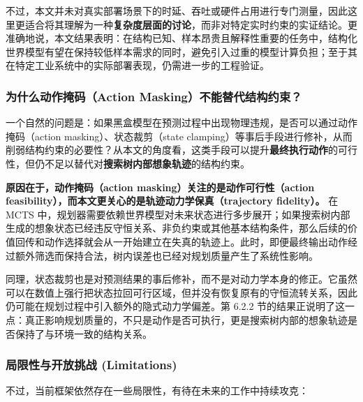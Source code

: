 \documentclass[UTF8]{ctexart}
\begin{document}
不过，本文并未对真实部署场景下的时延、吞吐或硬件占用进行专门测量，因此这里更适合将其理解为一种\textbf{复杂度层面的讨论}，而非对特定实时约束的实证结论。更准确地说，本文结果表明：在结构已知、样本昂贵且解释性重要的任务中，结构化世界模型有望在保持较低样本需求的同时，避免引入过重的模型计算负担；至于其在特定工业系统中的实际部署表现，仍需进一步的工程验证。

\hypertarget{ux9884ux5148ux5e94ux5bf9ux53efux80fdux8d28ux7591ux4e3aux4ec0ux4e48-action-masking-ux4e0dux591fux7528}{%
\subsubsection{为什么动作掩码（Action Masking）不能替代结构约束？}\label{ux9884ux5148ux5e94ux5bf9ux53efux80fdux8d28ux7591ux4e3aux4ec0ux4e48-action-masking-ux4e0dux591fux7528}}

一个自然的问题是：如果黑盒模型在预测过程中出现物理违规，是否可以通过动作掩码（action masking）、状态裁剪（state clamping）等事后手段进行修补，从而削弱结构约束的必要性？从本文的角度看，这类手段可以提升\textbf{最终执行动作}的可行性，但仍不足以替代对\textbf{搜索树内部想象轨迹}的结构约束。

\textbf{原因在于，动作掩码（action masking）关注的是动作可行性（action feasibility），而本文更关心的是轨迹动力学保真（trajectory fidelity）。} 在 MCTS 中，规划器需要依赖世界模型对未来状态进行多步展开；如果搜索树内部生成的想象状态已经违反守恒关系、非负约束或其他基本结构条件，那么后续的价值回传和动作选择就会从一开始建立在失真的轨迹上。此时，即便最终输出动作经过额外筛选而保持合法，树内误差也已经对规划质量产生了系统性影响。

同理，状态裁剪也是对预测结果的事后修补，而不是对动力学本身的修正。它虽然可以在数值上强行把状态拉回可行区域，但并没有恢复原有的守恒流转关系，因此仍可能在规划过程中引入额外的隐式动力学偏差。第 6.2.2 节的结果正说明了这一点：真正影响规划质量的，不只是动作是否可执行，更是搜索树内部的想象轨迹是否保持了与环境一致的结构关系。

\hypertarget{ux5c40ux9650ux6027ux4e0eux5f00ux653eux6311ux6218-limitations}{%
\subsubsection{局限性与开放挑战
(Limitations)}\label{ux5c40ux9650ux6027ux4e0eux5f00ux653eux6311ux6218-limitations}}

不过，当前框架依然存在一些局限性，有待在未来的工作中持续攻克：
\end{document}

